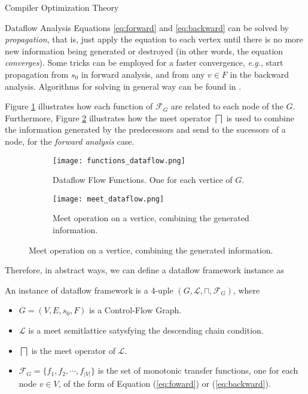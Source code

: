 \begin{section}{Compiler Optimization Theory}
\begin{subsection}{Dataflow Analysis}
	Equations \ref{eq:forward} and \ref{eq:backward} can be solved by
	\textit{propagation}, that is, just apply the equation to each vertex until
	there is no more new information being generated or destroyed (in other
	words, the equation \textit{converges}). Some tricks can be employed for a faster
	convergence, \textit{e.g.}, start propagation from $s_0$ in
	forward analysis, and from any $v \in F$ in the backward analysis.
	Algorithms for solving in general way can be found in
	\citep{khedker2009data}.

	Figure \ref{fig:functions_dataflow} illustrates how each function of $\mathcal{F}_G$
	are related to each node of the $G$. Furthermore, Figure \ref{fig:meet_dataflow}
	illustrates how the meet operator $\bigsqcap$ is used to combine the information
	generated by the predecessors and send to the sucessors of a node, for
	the \textit{forward analysis} case.

\begin{figure}[ht]
\centering
  \begin{subfigure}[b]{0.40\textwidth}
	 \texttt{[image: functions\_dataflow.png]}
	  \label{fig:functions_dataflow}
	  \caption{Dataflow Flow Functions. One for each vertice of $G$. \citep{khedker2009data}}
  \end{subfigure}
  \begin{subfigure}[b]{0.40\textwidth}
	 \texttt{[image: meet\_dataflow.png]}
	  \label{fig:meet_dataflow}
	  \caption{Meet operation on a vertice, combining the generated information. \citep{khedker2009data}}
  \end{subfigure}
  \label{fig:dataflow}
\end{figure}

	Therefore, in abstract ways, we can define a dataflow framework instance as
	\begin{definition}
		An instance of dataflow framework is a 4-uple $(G, \mathcal{L}, \sqcap, \mathcal{F}_G)$,
		where
		\begin{itemize}
			\item $G = (V, E, s_0, F)$ is a Control-Flow Graph.
			\item $\mathcal{L}$ is a meet semitlattice satysfying the descending chain condition.
			\item $\bigsqcap$ is the meet operator of $\mathcal{L}$.
			\item $\mathcal{F}_G = \{f_1, f_2, \cdots, f_{|V|}\}$ is the set of monotonic transfer
			functions, one for each node $v \in V$, of the form of Equation (\ref{eq:foward}) or (\ref{eq:backward}).
		\end{itemize}
	\end{definition}


\end{subsection}
\end{section}
